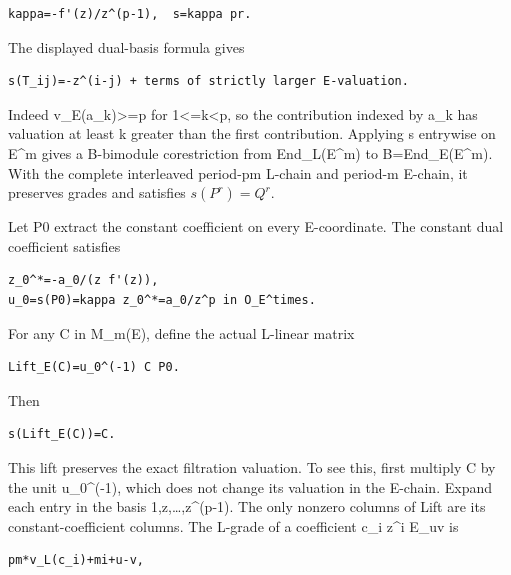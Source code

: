 \begin{Verbatim}[fontsize=\small,breaklines=true,breakanywhere=true]
kappa=-f'(z)/z^(p-1),  s=kappa pr.
\end{Verbatim}

The displayed dual-basis formula gives

\begin{Verbatim}[fontsize=\small,breaklines=true,breakanywhere=true]
s(T_ij)=-z^(i-j) + terms of strictly larger E-valuation.
\end{Verbatim}

Indeed v\_E(a\_k)\textgreater=p for 1\textless=k\textless p, so the
contribution indexed by a\_k has valuation at least k greater than the
first contribution. Applying s entrywise on E\^{}m gives a B-bimodule
corestriction from End\_L(E\^{}m) to B=End\_E(E\^{}m). With the complete
interleaved period-pm L-chain and period-m E-chain, it preserves grades
and satisfies \(s(P^r)=Q^r\).

Let P0 extract the constant coefficient on every E-coordinate. The
constant dual coefficient satisfies

\begin{Verbatim}[fontsize=\small,breaklines=true,breakanywhere=true]
z_0^*=-a_0/(z f'(z)),
u_0=s(P0)=kappa z_0^*=a_0/z^p in O_E^times.
\end{Verbatim}

For any C in M\_m(E), define the actual L-linear matrix

\begin{Verbatim}[fontsize=\small,breaklines=true,breakanywhere=true]
Lift_E(C)=u_0^(-1) C P0.
\end{Verbatim}

Then

\begin{Verbatim}[fontsize=\small,breaklines=true,breakanywhere=true]
s(Lift_E(C))=C.
\end{Verbatim}

This lift preserves the exact filtration valuation. To see this, first
multiply C by the unit u\_0\^{}(-1), which does not change its valuation
in the E-chain. Expand each entry in the basis 1,z,\ldots,z\^{}(p-1).
The only nonzero columns of Lift are its constant-coefficient columns.
The L-grade of a coefficient c\_i z\^{}i E\_uv is

\begin{Verbatim}[fontsize=\small,breaklines=true,breakanywhere=true]
pm*v_L(c_i)+mi+u-v,
\end{Verbatim}

